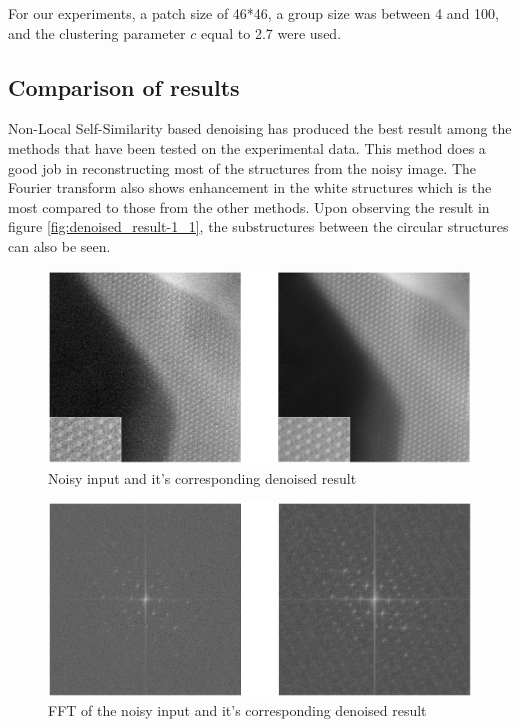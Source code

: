 \documentclass[fleqn,10pt]{wlscirep}
\begin{document}
For our experiments, a patch size of 46*46, a group size was between 4 and 100, and the clustering parameter $c$ equal to 2.7 were used.



\subsection*{Comparison of results}

\label{sec:comparison}



Non-Local Self-Similarity based denoising has produced the best result among the methods that have been tested on the experimental data. This method does a good job in reconstructing most of the structures from the noisy image. The Fourier transform also shows enhancement in the white structures which is the most compared to those from the other methods. Upon observing the result in figure \ref{fig:denoised_result-1_1}, the substructures between the circular structures can also be seen. 


\begin{figure}
	\centering
	\includegraphics[scale=0.1]{./imgs/denoised_result-1.png}
	\caption[Non-Local Self-Similarity based image denoising result]{Noisy input and it's corresponding denoised result}
	\label{fig:denoised_result-1}
\end{figure}

\begin{figure}
	\centering
	\includegraphics[scale=0.55]{./imgs/denoised_result_fft-1.png}
	\caption[FFT of the Non-Local Self-Similarity based image denoising result]{FFT of the noisy input and it's corresponding denoised result}
	\label{fig:denoised_result_fft-1}
\end{figure}
\end{document}
